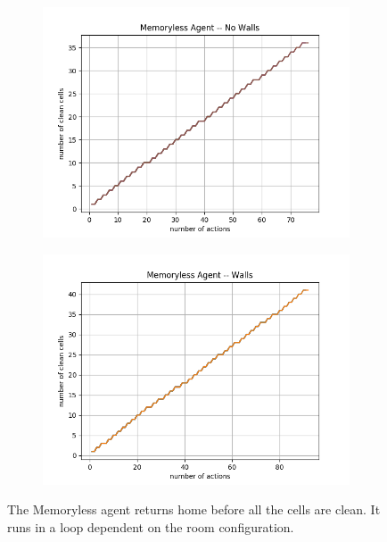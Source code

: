 \documentclass[12pt]{article}
\begin{document}
\begin{figure}[!h]
	\centering
	\begin{subfigure}[t]{.48\textwidth}
		\includegraphics[scale=.4]{MemorylessAgent1}
		\label{fig:MemoryLNoWall}
	\end{subfigure}
	\hfill
	\begin{subfigure}[t]{.48\textwidth}
		\includegraphics[scale=.4]{MemorylessAgent2}
		\label{fig:MemoryLWall}
	\end{subfigure}
	\caption{The Memoryless agent returns home before all the cells are clean.  It runs in a loop dependent on the room configuration.}
	\label{f:Memoryless}	
\end{figure}
\end{document}
